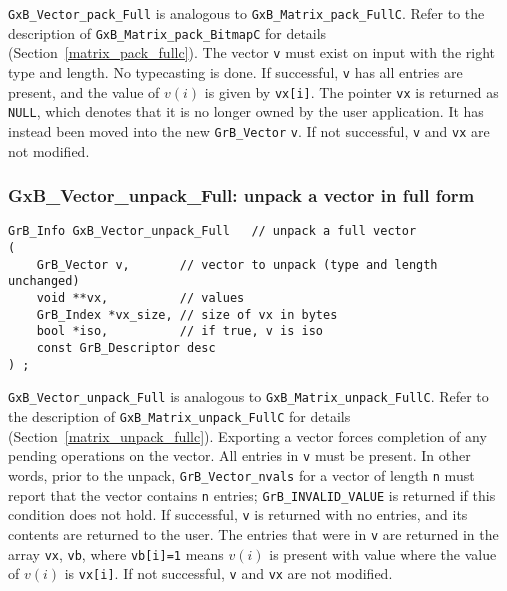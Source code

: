 \documentclass[12pt]{article}
\begin{document}
\noindent
\verb'GxB_Vector_pack_Full' is analogous to \verb'GxB_Matrix_pack_FullC'.
Refer to the description of \verb'GxB_Matrix_pack_BitmapC' for details
(Section~\ref{matrix_pack_fullc}).
The vector \verb'v' must exist on input with the right type and length.
No typecasting is done.
If successful, \verb'v' has
all entries are present, and the value of $v(i)$ is given by \verb'vx[i]'.
The pointer \verb'vx' is returned as \verb'NULL', which denotes that it is no
longer owned by the user application.  It has instead been moved into the new
\verb'GrB_Vector' \verb'v'.
If not successful, \verb'v' and
\verb'vx' are not modified.

\subsubsection{{\sf GxB\_Vector\_unpack\_Full:} unpack a vector in full form}
\label{vector_unpack_full}

\begin{mdframed}[userdefinedwidth=6in]
{\footnotesize
\begin{verbatim}
GrB_Info GxB_Vector_unpack_Full   // unpack a full vector
(
    GrB_Vector v,       // vector to unpack (type and length unchanged)
    void **vx,          // values
    GrB_Index *vx_size, // size of vx in bytes
    bool *iso,          // if true, v is iso
    const GrB_Descriptor desc
) ;
\end{verbatim}
} \end{mdframed}

\verb'GxB_Vector_unpack_Full' is analogous to \verb'GxB_Matrix_unpack_FullC'.
Refer to the description of \verb'GxB_Matrix_unpack_FullC' for details
(Section~\ref{matrix_unpack_fullc}).
Exporting a vector forces completion of any pending operations on the vector.
All entries in \verb'v' must be present.  In other words, prior to the unpack,
\verb'GrB_Vector_nvals' for a vector of length \verb'n' must report that the
vector contains \verb'n' entries; \verb'GrB_INVALID_VALUE' is returned if this
condition does not hold.
If successful, \verb'v' is returned with no entries, and its contents are
returned to the user. The entries
that were in \verb'v' are returned in the array \verb'vx', \verb'vb', where
\verb'vb[i]=1' means $v(i)$ is present with value where the value of $v(i)$ is
\verb'vx[i]'.
If not successful, \verb'v' and \verb'vx' are not modified.
\end{document}
